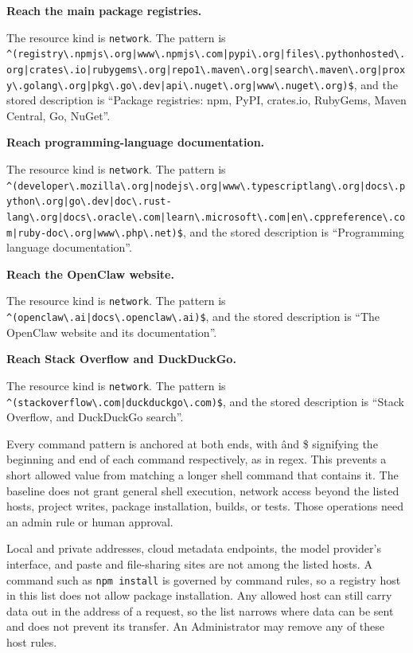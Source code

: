 \begin{enumerate}
  {\color{red}\item \textbf{Reach the main package registries.}

  The resource kind is \texttt{network}. The pattern is
  \lstinline[style=gpattern]~^(registry\.npmjs\.org|www\.npmjs\.com|pypi\.org|files\.pythonhosted\.org|crates\.io|rubygems\.org|repo1\.maven\.org|search\.maven\.org|proxy\.golang\.org|pkg\.go\.dev|api\.nuget\.org|www\.nuget\.org)$~,
  and the stored description is ``Package registries: npm, PyPI, crates.io,
  RubyGems, Maven Central, Go, NuGet''.}

  {\color{red}\item \textbf{Reach programming-language documentation.}

  The resource kind is \texttt{network}. The pattern is
  \lstinline[style=gpattern]~^(developer\.mozilla\.org|nodejs\.org|www\.typescriptlang\.org|docs\.python\.org|go\.dev|doc\.rust-lang\.org|docs\.oracle\.com|learn\.microsoft\.com|en\.cppreference\.com|ruby-doc\.org|www\.php\.net)$~,
  and the stored description is ``Programming language documentation''.}

  {\color{red}\item \textbf{Reach the OpenClaw website.}

  The resource kind is \texttt{network}. The pattern is
  \lstinline[style=gpattern]~^(openclaw\.ai|docs\.openclaw\.ai)$~, and the
  stored description is ``The OpenClaw website and its documentation''.}

  {\color{red}\item \textbf{Reach Stack Overflow and DuckDuckGo.}

  The resource kind is \texttt{network}. The pattern is
  \lstinline[style=gpattern]~^(stackoverflow\.com|duckduckgo\.com)$~, and the
  stored description is ``Stack Overflow, and DuckDuckGo search''.}
\end{enumerate}
\endgroup

Every command pattern is anchored at both ends, with \^ and \$ signifying the beginning and end of each command respectively, as in regex. This prevents a short allowed
value from matching a longer shell command that contains it. The baseline does
not grant general shell execution, network access {\color{red}beyond the
listed hosts}, project writes, package
installation, builds, or tests. Those operations need an admin rule or human
approval.

{\color{red}Local and private addresses, cloud metadata endpoints, the model
provider's interface, and paste and file-sharing sites are not among the
listed hosts. A command such as \texttt{npm install} is governed by command
rules, so a registry host in this list does not allow package installation.
Any allowed host can still carry data out in the address of a request, so the
list narrows where data can be sent and does not prevent its transfer. An
Administrator may remove any of these host rules.}

